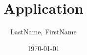 \title{Application}
\author{LastName, FirstName}
\date{\today}




	
	
	\clearpage
	
	
	\clearpage
	
	
	\clearpage
	
	
	\clearpage
	
		
